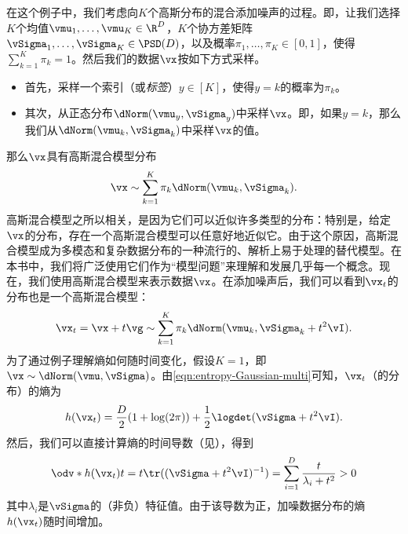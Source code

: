 \documentclass[../../book-main_zh.tex]{subfiles}
\begin{document}
\begin{example}[向高斯混合添加噪声]\label{ex:gaussian_mixture}
    在这个例子中，我们考虑向\(K\)个高斯分布的混合添加噪声的过程。即，让我们选择\(K\)个均值\(\vmu_{1}, \dots, \vmu_{K} \in \R^{D}\)，\(K\)个协方差矩阵\(\vSigma_{1}, \dots, \vSigma_{K} \in \PSD(D)\)，以及概率\(\pi_{1}, \dots, \pi_{K} \in [0, 1]\)，使得\(\sum_{k = 1}^{K}\pi_{k} = 1\)。然后我们的数据\(\vx\)按如下方式采样。
    \begin{itemize}
        \item 首先，采样一个索引（或\textit{标签}）\(y \in [K]\)，使得\(y = k\)的概率为\(\pi_{k}\)。
        \item 其次，从正态分布\(\dNorm(\vmu_{y}, \vSigma_{y})\)中采样\(\vx\)。即，如果\(y = k\)，那么我们从\(\dNorm(\vmu_{k}, \vSigma_{k})\)中采样\(\vx\)的值。
    \end{itemize}
    那么\(\vx\)具有高斯混合模型分布
    \begin{equation}
        \vx \sim \sum_{k = 1}^{K}\pi_{k}\dNorm(\vmu_{k}, \vSigma_{k}).
    \end{equation}
    高斯混合模型之所以相关，是因为它们可以近似许多类型的分布：特别是，给定\(\vx\)的分布，存在一个高斯混合模型可以任意好地近似它。由于这个原因，高斯混合模型成为多模态和复杂数据分布的一种流行的、解析上易于处理的替代模型。在本书中，我们将广泛使用它们作为“模型问题”来理解和发展几乎每一个概念。现在，我们使用高斯混合模型来表示数据\(\vx\)。在添加噪声后，我们可以看到\(\vx_{t}\)的分布也是一个高斯混合模型：
    \begin{equation}
        \vx_{t} = \vx + t\vg \sim \sum_{k =
        1}^{K}\pi_{k}\dNorm(\vmu_{k}, \vSigma_{k} + t^{2}\vI).
    \end{equation}
    为了通过例子理解熵如何随时间变化，假设\(K=1\)，即\(\vx \sim \dNorm(\vmu, \vSigma)\)。由\eqref{eqn:entropy-Gaussian-multi}可知，\(\vx_{t}\)（的分布）的熵为
    \begin{equation}
        h(\vx_{t}) = \frac{D}{2}(1 + \log(2\pi)) +
        \frac{1}{2}\logdet(\vSigma + t^{2}\vI).
    \end{equation}
    然后，我们可以直接计算熵的时间导数（见），得到
    \begin{equation}
        \odv*{h(\vx_{t})}{t} = t\tr((\vSigma + t^{2}\vI)^{-1}) =
        \sum_{i = 1}^{D}\frac{t}{\lambda_{i} + t^{2}} > 0
    \end{equation}
    其中\(\lambda_{i}\)是\(\vSigma\)的（非负）特征值。由于该导数为正，加噪数据分布的熵\(h(\vx_{t})\)随时间增加。
\end{example}
\end{document}
